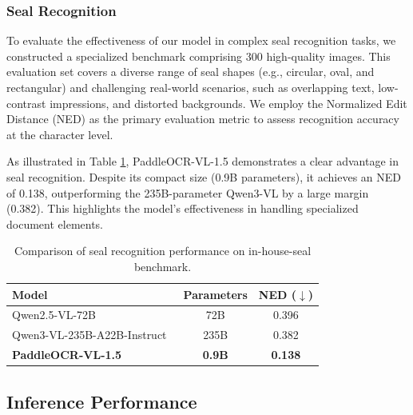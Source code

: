 \documentclass[11pt, a4paper,logo,  copyright, nonumbering]{paddleocr}
\begin{document}
\subsubsection{Seal Recognition}
\label{Seal Recognition}

To evaluate the effectiveness of our model in complex seal recognition tasks, we constructed a specialized benchmark comprising 300 high-quality images. This evaluation set covers a diverse range of seal shapes (e.g., circular, oval, and rectangular) and challenging real-world scenarios, such as overlapping text, low-contrast impressions, and distorted backgrounds. We employ the Normalized Edit Distance (NED) as the primary evaluation metric to assess recognition accuracy at the character level.

As illustrated in Table \ref{table:seal_results}, PaddleOCR-VL-1.5 demonstrates a clear advantage in seal recognition. Despite its compact size (0.9B parameters), it achieves an NED of 0.138, outperforming the 235B-parameter Qwen3-VL by a large margin (0.382). This highlights the model's effectiveness in handling specialized document elements.

\begin{table}[ht]
\centering
 \fontsize{8}{8}\selectfont
\renewcommand{\arraystretch}{1.2}

\begin{tabular}{l|c|c}
\toprule
\textbf{Model} & \textbf{Parameters} & \textbf{NED ($\downarrow$)} \\ 
\midrule
Qwen2.5-VL-72B~\cite{bai2025qwen2} & 72B & 0.396 \\
Qwen3-VL-235B-A22B-Instruct~\cite{yang2025qwen3} & 235B & 0.382 \\ 
\textbf{PaddleOCR-VL-1.5} & \cellcolor{red!15}\textbf{0.9B} & \cellcolor{red!15}\textbf{0.138} \\ 
\bottomrule
\end{tabular}
\caption{Comparison of seal recognition performance on in-house-seal benchmark.}
\label{table:seal_results}
\end{table}


\subsection{Inference Performance}
\end{document}
